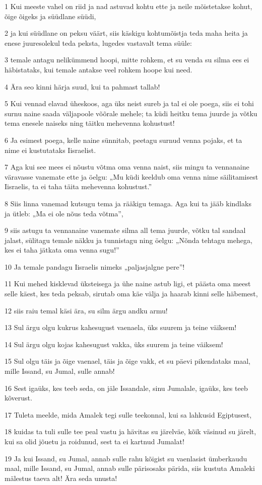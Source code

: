 \par 1 Kui meeste vahel on riid ja nad astuvad kohtu ette ja neile mõistetakse kohut, õige õigeks ja süüdlane süüdi,
\par 2 ja kui süüdlane on peksu väärt, siis käskigu kohtumõistja teda maha heita ja enese juuresolekul teda peksta, lugedes vastavalt tema süüle:
\par 3 temale antagu nelikümmend hoopi, mitte rohkem, et su venda su silma ees ei häbistataks, kui temale antakse veel rohkem hoope kui need.
\par 4 Ära seo kinni härja suud, kui ta pahmast tallab!
\par 5 Kui vennad elavad üheskoos, aga üks neist sureb ja tal ei ole poega, siis ei tohi surnu naine saada väljapoole võõrale mehele; ta küdi heitku tema juurde ja võtku tema enesele naiseks ning täitku mehevenna kohustust!
\par 6 Ja esimest poega, kelle naine sünnitab, peetagu surnud venna pojaks, et ta nime ei kustutataks Iisraelist.
\par 7 Aga kui see mees ei nõustu võtma oma venna naist, siis mingu ta vennanaine väravasse vanemate ette ja öelgu: „Mu küdi keeldub oma venna nime säilitamisest Iisraelis, ta ei taha täita mehevenna kohustust.”
\par 8 Siis linna vanemad kutsugu tema ja rääkigu temaga. Aga kui ta jääb kindlaks ja ütleb: „Ma ei ole nõus teda võtma”,
\par 9 siis astugu ta vennanaine vanemate silma all tema juurde, võtku tal sandaal jalast, sülitagu temale näkku ja tunnistagu ning öelgu: „Nõnda tehtagu mehega, kes ei taha jätkata oma venna sugu!”
\par 10 Ja temale pandagu Iisraelis nimeks „paljasjalgne pere”!
\par 11 Kui mehed kisklevad üksteisega ja ühe naine astub ligi, et päästa oma meest selle käest, kes teda peksab, sirutab oma käe välja ja haarab kinni selle häbemest,
\par 12 siis raiu temal käsi ära, su silm ärgu andku armu!
\par 13 Sul ärgu olgu kukrus kahesugust vaenaela, üks suurem ja teine väiksem!
\par 14 Sul ärgu olgu kojas kahesugust vakka, üks suurem ja teine väiksem!
\par 15 Sul olgu täis ja õige vaenael, täis ja õige vakk, et su päevi pikendataks maal, mille Issand, su Jumal, sulle annab!
\par 16 Sest igaüks, kes teeb seda, on jäle Issandale, sinu Jumalale, igaüks, kes teeb kõverust.
\par 17 Tuleta meelde, mida Amalek tegi sulle teekonnal, kui sa lahkusid Egiptusest,
\par 18 kuidas ta tuli sulle tee peal vastu ja hävitas su järelväe, kõik väsinud su järelt, kui sa olid jõuetu ja roidunud, sest ta ei kartnud Jumalat!
\par 19 Ja kui Issand, su Jumal, annab sulle rahu kõigist su vaenlasist ümberkaudu maal, mille Issand, su Jumal, annab sulle pärisosaks pärida, siis kustuta Amaleki mälestus taeva alt! Ära seda unusta!

